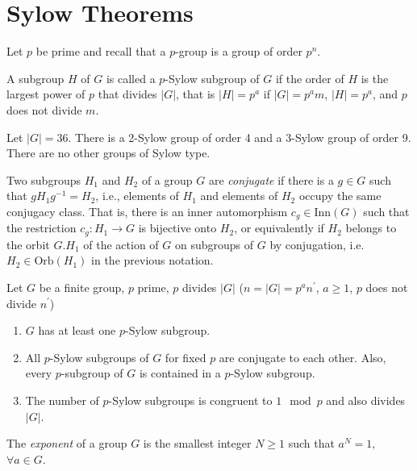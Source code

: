 \section{Sylow Theorems}
Let $p$ be prime and recall that a $p$-group is a group of order
$p^n$.

\begin{defn}
A subgroup $H$ of $G$ is called a $p$-Sylow subgroup of $G$ if the
order of $H$ is the largest power of $p$ that divides $|G|$, that is
$|H| = p^a$ if $|G| = p^a m$, $|H| = p^a$, and $p$ does not divide $m$.
\end{defn}

\begin{xmpl}
Let $|G| = 36$. There is a 2-Sylow group of order 4 and a 3-Sylow
group of order 9. There are no other groups of Sylow type.
\end{xmpl}

\begin{defn}
Two subgroups $H_1$ and $H_2$ of a group $G$ are \emph{conjugate} if
there is a $g \in G$ such that $g H_1 g^{-1} = H_2$, i.e., elements of
$H_1$ and elements of $H_2$ occupy the same conjugacy class.
That is, there is an inner automorphism $c_g \in \mathrm{Inn}(G)$ such
that the restriction $c_g : H_1 \to G$ is bijective onto $H_2$, or
equivalently if $H_2$ belongs to the orbit $G . H_1$ of the action of
$G$ on subgroups of $G$ by conjugation, i.e. $H_2 \in
\mathrm{Orb}(H_1)$ in the previous notation.
\end{defn}

\begin{theorem}
  Let $G$ be a finite group, $p$ prime, $p$ divides $|G|$
  ($n = |G| = p^a n^\prime$, $a \geq 1$, $p$ does not divide $n^\prime$)
  \begin{enumerate}
    \item{$G$ has at least one $p$-Sylow subgroup.
         }
    \item{All $p$-Sylow subgroups of $G$ for fixed $p$ are conjugate
          to each other. Also, every $p$-subgroup of $G$ is contained
          in a $p$-Sylow subgroup.
         }
    \item{The number of $p$-Sylow subgroups is congruent to $1 \mod p$
          and also divides $|G|$.
         }
  \end{enumerate}
\end{theorem}

\begin{defn}
The \emph{exponent} of a group $G$ is the smallest integer $N \geq 1$
such that $a^N = 1,$ $\forall a \in G$.
\end{defn}


